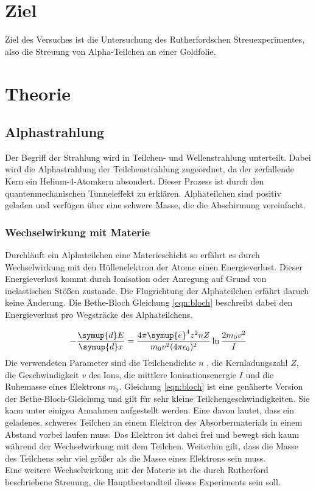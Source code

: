 \section{Ziel}
Ziel des Versuches ist die Untersuchung des Rutherfordschen Streuexperimentes,
also die Streuung von Alpha-Teilchen an einer Goldfolie.

\section{Theorie}
\subsection{Alphastrahlung}
Der Begriff der Strahlung wird in Teilchen- und Wellenstrahlung unterteilt. Dabei
wird die Alphastrahlung der Teilchenstrahlung zugeordnet, da der zerfallende
Kern ein Helium-4-Atomkern absondert. Dieser Prozess ist durch den quantenmechanischen
Tunneleffekt zu erklären. Alphateilchen sind positiv geladen und verfügen über
eine schwere Masse, die die Abschirmung vereinfacht. \cite{potsdam}

\subsubsection{Wechselwirkung mit Materie}
Durchläuft ein Alphateilchen eine Materieschicht so erfährt es durch
Wechselwirkung mit den Hüllenelektron der Atome einen Energieverlust. Dieser
Energieverlust kommt durch Ionisation oder Anregung auf Grund von inelastischen
Stößen zustande. Die Flugrichtung der Alphateilchen erfährt daruch keine
Änderung. Die Bethe-Bloch Gleichung \eqref{eqn:bloch} beschreibt dabei den
Energieverlust pro Wegsträcke des Alphateilchens.

\begin{equation}
- \frac{\symup{d} E}{\symup{d} x} = \frac{4 \pi \symup{e}^4 z^2 {n} {Z}}
{{m}_0 v^2 (4 \pi \epsilon_0)^2} \ln\frac{2 {m}_0 v^2}{{I}}
\label{eqn:bloch}
\end{equation}
Die verwendeten Parameter sind die Teilchendichte $n$
, die Kernladungszahl $Z$, die Geschwindigkeit $v$ des Ions, die mittlere
Ionisationsenergie $I$ und die Ruhemasse eines Elektrons ${m}_0$.
Gleichung \eqref{eqn:bloch} ist eine genäherte Version der Bethe-Bloch-Gleichung
und gilt für sehr kleine Teilchengeschwindigkeiten. Sie kann unter einigen
Annahmen aufgestellt werden. Eine davon lautet, dass ein geladenes, schweres
Teilchen an einem Elektron des Absorbermaterials in einem Abstand vorbei laufen
muss. Das Elektron ist dabei frei und bewegt sich kaum während der Wechselwirkung
mit dem Teilchen. Weiterhin gilt, dass die Masse des Teilchens sehr viel größer
als die Masse eines Elektrons sein muss.
\\
Eine weitere Wechselwirkung mit der Materie ist die durch Rutherford beschriebene
Streuung, die Hauptbestandteil dieses Experiments sein soll.

